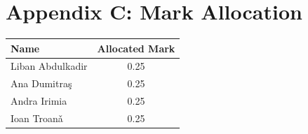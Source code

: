 \documentclass{article}
\begin{document}
\chapter{\textbf{Appendix C: Mark Allocation}}
\begin{flushleft}
    \begin{tabular}{| l | c |}
    \hline
    \textbf{Name} & \textbf{Allocated Mark}\\ \hline
    Liban Abdulkadir & 0.25\\ \hline
    Ana Dumitra\c{s} & 0.25 \\ \hline
    Andra Irimia & 0.25 \\ \hline
    Ioan Troan\v{a} & 0.25 \\ \hline
    \end{tabular}
\end{flushleft}
\end{document}
